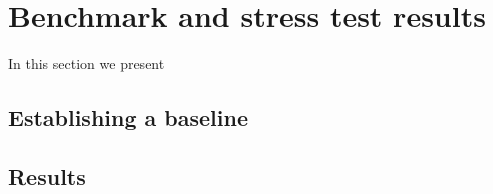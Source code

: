 \section{Benchmark and stress test results}
In this section we present


\subsection{Establishing a baseline}

\subsection{Results}
